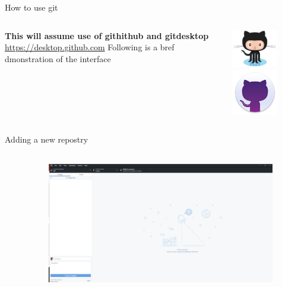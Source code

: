 \documentclass[10pt]{beamer}
\begin{document}
\begin{frame}[fragile]{How to use git}
  \begin{columns}[T]
    \begin{column}{.8\textwidth}
  	\textbf{This will assume use of githithub and gitdesktop\\}
	\url{https://desktop.github.com} \newline  \newline 
	Following is a bref dmonstration of the interface
    \end{column}
    \begin{column}{.2\textwidth}
	\includegraphics[width=2cm]{Figs/git/Octocat} \newline  \newline  \newline 
	\includegraphics[width=2cm]{Figs/git/gitdesktop}
    \end{column}
  \end{columns}
\end{frame}


\begin{frame}[fragile]{Adding a new repostry}
  \begin{columns}[T]
    \begin{column}{.12\textwidth}
    \end{column}
    \begin{column}{.88\textwidth}
	\includegraphics[width=10cm]{Figs/GHD/outline_02}
    \end{column}
  \end{columns}
\end{frame}
\end{document}
